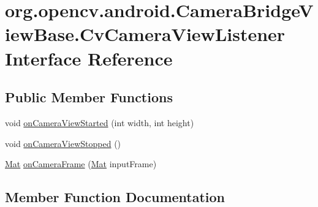 \hypertarget{interfaceorg_1_1opencv_1_1android_1_1_camera_bridge_view_base_1_1_cv_camera_view_listener}{}\section{org.\+opencv.\+android.\+Camera\+Bridge\+View\+Base.\+Cv\+Camera\+View\+Listener Interface Reference}
\label{interfaceorg_1_1opencv_1_1android_1_1_camera_bridge_view_base_1_1_cv_camera_view_listener}
\subsection*{Public Member Functions}
\begin{DoxyCompactItemize}
\item 
void \mbox{\hyperlink{interfaceorg_1_1opencv_1_1android_1_1_camera_bridge_view_base_1_1_cv_camera_view_listener_a7f908e34834761c8c1d6622989bb5a90}{on\+Camera\+View\+Started}} (int width, int height)
\item 
void \mbox{\hyperlink{interfaceorg_1_1opencv_1_1android_1_1_camera_bridge_view_base_1_1_cv_camera_view_listener_a23d02d02b84ae6496da2ac1d8b7c3b45}{on\+Camera\+View\+Stopped}} ()
\item 
\mbox{\hyperlink{classorg_1_1opencv_1_1core_1_1_mat}{Mat}} \mbox{\hyperlink{interfaceorg_1_1opencv_1_1android_1_1_camera_bridge_view_base_1_1_cv_camera_view_listener_a727a5b35122315b9278e5104c80749aa}{on\+Camera\+Frame}} (\mbox{\hyperlink{classorg_1_1opencv_1_1core_1_1_mat}{Mat}} input\+Frame)
\end{DoxyCompactItemize}


\subsection{Member Function Documentation}
\mbox{\label{interfaceorg_1_1opencv_1_1android_1_1_camera_bridge_view_base_1_1_cv_camera_view_listener_a727a5b35122315b9278e5104c80749aa}} 
